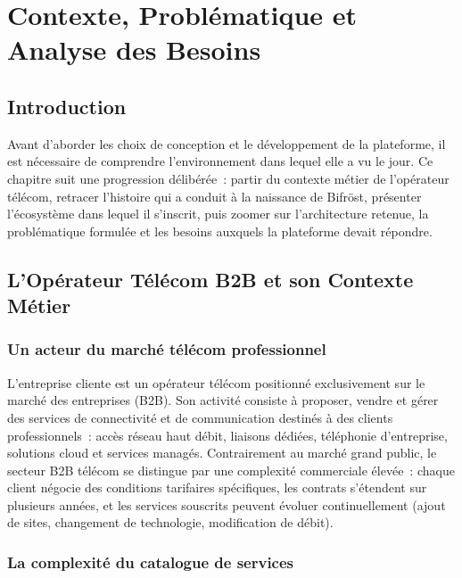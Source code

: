 ﻿\chapter{Contexte, Probl\'ematique et Analyse des Besoins}
\clearpage
\label{chap:contexte}

\section{Introduction}

Avant d'aborder les choix de conception et le d\'eveloppement de la plateforme, il est n\'ecessaire de comprendre l'environnement dans lequel elle a vu le jour. Ce chapitre suit une progression d\'elib\'er\'ee~: partir du contexte m\'etier de l'op\'erateur t\'el\'ecom, retracer l'histoire qui a conduit \`a la naissance de Bifr\"ost, pr\'esenter l'\'ecosyst\`eme dans lequel il s'inscrit, puis zoomer sur l'architecture retenue, la probl\'ematique formul\'ee et les besoins auxquels la plateforme devait r\'epondre.

\section{L'Op\'erateur T\'el\'ecom B2B et son Contexte M\'etier}

\subsection{Un acteur du march\'e t\'el\'ecom professionnel}

L'entreprise cliente est un op\'erateur t\'el\'ecom positionn\'e exclusivement sur le march\'e des entreprises (B2B). Son activit\'e consiste \`a proposer, vendre et g\'erer des services de connectivit\'e et de communication destin\'es \`a des clients professionnels~: acc\`es r\'eseau haut d\'ebit, liaisons d\'edi\'ees, t\'el\'ephonie d'entreprise, solutions cloud et services manag\'es. Contrairement au march\'e grand public, le secteur B2B t\'el\'ecom se distingue par une complexit\'e commerciale \'elev\'ee~: chaque client n\'egocie des conditions tarifaires sp\'ecifiques, les contrats s'\'etendent sur plusieurs ann\'ees, et les services souscrits peuvent \'evoluer continuellement (ajout de sites, changement de technologie, modification de d\'ebit).

\subsection{La complexit\'e du catalogue de services}

